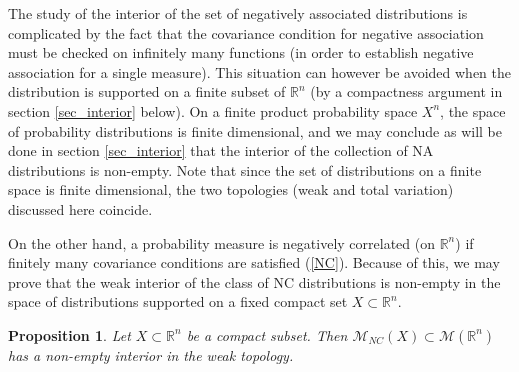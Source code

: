 \documentclass[11pt]{article}
\newcommand{\R}{\mathbb{R}}
\newcommand{\m}{\mathcal{M}}
\newtheorem{prop}{Proposition}
\begin{document}

The study of the interior of the set of negatively associated distributions is complicated by the fact 
that the covariance condition for negative association must be checked on infinitely many
functions (in order to establish negative association for a single measure). This situation can however be avoided when the distribution is supported on a finite
subset of $\R^n$
(by a compactness argument in section \ref{sec_interior} below).
On a finite product probability space $X^n$, the space of probability
distributions is finite dimensional, and we may conclude as will be done in 
section \ref{sec_interior} that the interior of the collection of NA distributions is non-empty. Note that since the set of distributions on a finite space is finite dimensional, the two topologies (weak and total variation) discussed here coincide.


On the other hand, a probability measure is negatively correlated (on $\R^n$) if finitely many covariance conditions are satisfied (\ref{NC}). Because of this, we may prove that the weak interior of the class of NC distributions is non-empty in the space of distributions supported on a fixed compact set $X\subset \R^n$.


\begin{prop}
Let $X\subset \R^n$ be a compact subset. Then  $\m_{NC}(X)\subset \m(\R^n)$ has a non-empty interior in the weak topology.   
\end{prop}
\end{document}
